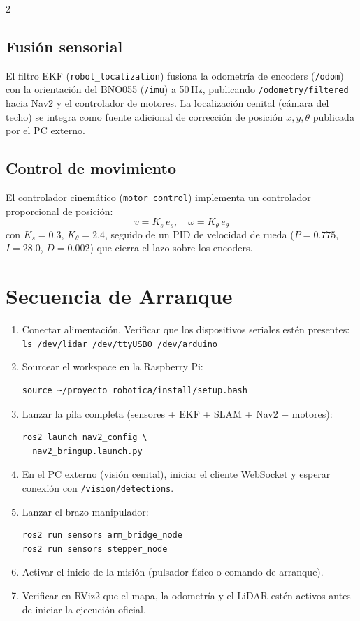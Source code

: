 \documentclass[10pt,a4paper]{article}
\newcommand{\topic}[1]{\texttt{\small #1}}
\begin{document}
\begin{multicols}{2}
\subsection{Fusión sensorial}

El filtro EKF (\texttt{robot\_localization}) fusiona la odometría de encoders (\topic{/odom}) con la orientación del BNO055 (\topic{/imu}) a 50\,Hz, publicando \topic{/odometry/filtered} hacia Nav2 y el controlador de motores. La localización cenital (cámara del techo) se integra como fuente adicional de corrección de posición $x, y, \theta$ publicada por el PC externo.

\subsection{Control de movimiento}

El controlador cinemático (\texttt{motor\_control}) implementa un controlador proporcional de posición:
\[
  v = K_s\, e_s, \quad \omega = K_\theta\, e_\theta
\]
con $K_s=0.3$, $K_\theta=2.4$, seguido de un PID de velocidad de rueda ($P=0.775$, $I=28.0$, $D=0.002$) que cierra el lazo sobre los encoders.

\columnbreak

\section{Secuencia de Arranque}

\begin{enumerate}
  \item Conectar alimentación. Verificar que los dispositivos seriales estén presentes:\\
        \texttt{ls /dev/lidar /dev/ttyUSB0 /dev/arduino}
  \item Sourcear el workspace en la Raspberry Pi:
        \begin{verbatim}
source ~/proyecto_robotica/install/setup.bash
        \end{verbatim}
  \item Lanzar la pila completa (sensores + EKF + SLAM + Nav2 + motores):
        \begin{verbatim}
ros2 launch nav2_config \
  nav2_bringup.launch.py
        \end{verbatim}
  \item En el PC externo (visión cenital), iniciar el cliente WebSocket y esperar conexión con \topic{/vision/detections}.
  \item Lanzar el brazo manipulador:
        \begin{verbatim}
ros2 run sensors arm_bridge_node
ros2 run sensors stepper_node
        \end{verbatim}
  \item Activar el inicio de la misión (pulsador físico o comando de arranque).
  \item Verificar en RViz2 que el mapa, la odometría y el LiDAR estén activos antes de iniciar la ejecución oficial.
\end{enumerate}


\end{multicols}
\end{document}
